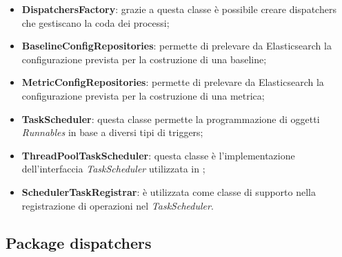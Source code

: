         \begin{itemize}
        	\item \textbf{DispatchersFactory}: grazie a questa classe è possibile creare dispatchers che gestiscano la coda
        		dei processi;
        	\item \textbf{BaselineConfigRepositories}: permette di prelevare da Elasticsearch la configurazione prevista
        		per la costruzione di una baseline;
        	\item \textbf{MetricConfigRepositories}: permette di prelevare da Elasticsearch la configurazione prevista
        		per la costruzione di una metrica;
        	\item \textbf{TaskScheduler}: questa classe permette la programmazione di oggetti \textit{Runnables} in
        		base a diversi tipi di triggers;
        	\item \textbf{ThreadPoolTaskScheduler}: questa classe è l'implementazione dell'interfaccia \textit{TaskScheduler} 
				utilizzata in \ProjectName{};
        	\item \textbf{SchedulerTaskRegistrar}: è utilizzata come classe di supporto nella registrazione di 
        		operazioni nel \textit{TaskScheduler}.
        \end{itemize}

\newpage

   \subsection{Package dispatchers}

